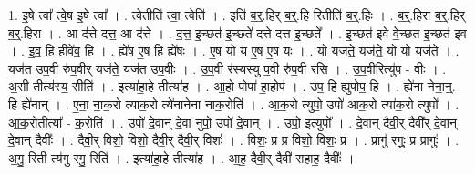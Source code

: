 \documentclass[17pt]{extarticle}
\begin{document}
1. इ॒षे त्वा᳚ त्वे॒ष इ॒षे त्वा᳚ । . त्वेतीति॑ त्वा॒ त्वेति॑ । . इति॑ ब॒र्॒.हिर् ब॒र्॒.हि रितीति॑ ब॒र्॒.हिः । . ब॒र्॒.हिरा ब॒र्॒.हिर् ब॒र्॒.हिरा । . आ द॑त्ते दत्त॒ आ द॑त्ते । . द॒त्त॒ इ॒च्छत॑ इ॒च्छते॑ दत्ते दत्त इ॒च्छते᳚ । . इ॒च्छत॑ इवे वे॒च्छत॑ इ॒च्छत॑ इव । . इ॒व॒ हि हीवे॑व॒ हि । . ह्ये॑ष ए॒ष हि ह्ये॑षः । . ए॒ष यो य ए॒ष ए॒ष यः । . यो यज॑ते॒ यज॑ते॒ यो यो यज॑ते । . यज॑त उप॒वी रु॑प॒वीर् यज॑ते॒ यज॑त उप॒वीः । . उ॒प॒वी र॑स्यस्यु प॒वी रु॑प॒वी र॑सि । . उ॒प॒वीरित्यु॑प - वीः । . अ॒सी तीत्य॑स्य॒ सीति॑ । . इत्या॑हा॒हे तीत्या॑ह । . आ॒हो पोपा॑ हा॒होप॑ । . उप॒ हि ह्युपोप॒ हि । . ह्ये॑ना नेना॒न्॒. हि ह्ये॑नान् । . ए॒ना॒ ना॒क॒रो त्या॑क॒रो त्ये॑नानेना नाक॒रोति॑ । . आ॒क॒रो त्युपो॒ उपो॑ आक॒रो त्या॑क॒रो त्युपो᳚ । . आ॒क॒रोतीत्या᳚ - क॒रोति॑ । . उपो॑ दे॒वान् दे॒वा नुपो॒ उपो॑ दे॒वान् । . उपो॒ इत्युपो᳚ । . दे॒वान् दैवी॒र् दैवी᳚र् दे॒वान् दे॒वान् दैवीः᳚ । . दैवी॒र् विशो॒ विशो॒ दैवी॒र् दैवी॒र् विशः॑ । . विशः॒ प्र प्र विशो॒ विशः॒ प्र । . प्रागु॑ रगुः॒ प्र प्रागुः॑ । . अ॒गु॒ रिती त्य॑गु रगु॒ रिति॑ । . इत्या॑हा॒हे तीत्या॑ह । . आ॒ह॒ दैवी॒र् दैवी॑ राहाह॒ दैवीः᳚ । \newline
\end{document}
